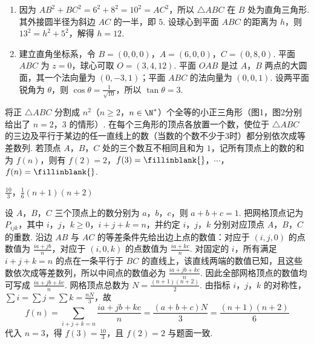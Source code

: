 \begin{solution}
\begin{enumerate}
\item 因为 \(AB^2+BC^2=6^2+8^2=10^2=AC^2\)，所以 \(\triangle ABC\) 在 \(B\) 处为直角三角形. 其外接圆半径为斜边 \(AC\) 的一半，即 \(5\). 设球心到平面 \(ABC\) 的距离为 \(h\)，则 \(13^2=h^2+5^2\)，解得 \(h=12\).
\item 建立直角坐标系，令 \(B=(0,0,0)\)，\(A=(6,0,0)\)，\(C=(0,8,0)\). 平面 \(ABC\) 为 \(z=0\)，球心可取 \(O=(3,4,12)\). 平面 \(OAB\) 是过 \(A\)，\(B\) 两点的大圆面，其一个法向量为 \((0,-3,1)\)；平面 \(ABC\) 的法向量为 \((0,0,1)\). 设两平面锐角为 \(\theta\)，则 \(\cos\theta=\frac{1}{\sqrt{10}}\)，所以 \(\tan\theta=3\).
\end{enumerate}
\end{solution}

\begin{problem}
将正 \(\triangle ABC\) 分割成 \(n^2\)（\(n \geqslant 2\)，\(n \in \N^*\)）个全等的小正三角形（图1，图2分别给出了 \(n = 2\)，\(3\) 的情形）. 在每个三角形的顶点各放置一个数，使位于 \(\triangle ABC\) 的三边及平行于某边的任一直线上的数（当数的个数不少于\(3\)时）都分别依次成等差数列. 若顶点 \(A\)，\(B\)，\(C\) 处的三个数互不相同且和为 \(1\)，记所有顶点上的数的和为 \(f(n)\)，则有 \(f(2) = 2\)，\(f(3) =\fillinblank{}\)，\(\cdots\)，\(f(n) =\fillinblank{}\).

\end{problem}

\begin{answer}
\(\frac{10}{3}\)，\(\frac{1}{6}(n + 1)(n + 2)\)
\end{answer}

\begin{solution}
设 \(A\)，\(B\)，\(C\) 三个顶点上的数分别为 \(a\)，\(b\)，\(c\)，则 \(a+b+c=1\). 把网格顶点记为 \(P_{ijk}\)，其中 \(i\)，\(j\)，\(k\geqslant0\)，\(i+j+k=n\)，并约定 \(i\)，\(j\)，\(k\) 分别对应顶点 \(A\)，\(B\)，\(C\) 的重数. 沿边 \(AB\) 与 \(AC\) 的等差条件先给出边上点的数值：对应于 \((i,j,0)\) 的点数值为 \(\frac{ia+jb}{n}\)，对应于 \((i,0,k)\) 的点数值为 \(\frac{ia+kc}{n}\). 对固定的 \(i\)，所有满足 \(i+j+k=n\) 的点在一条平行于 \(BC\) 的直线上，该直线两端的数值已知，且这些数依次成等差数列，所以中间点的数值必为 \(\frac{ia+jb+kc}{n}\). 因此全部网格顶点的数值均可写成 \(\frac{ia+jb+kc}{n}\). 网格顶点总数为 \(N=\frac{(n+1)(n+2)}2\). 由指标 \(i\)，\(j\)，\(k\) 的对称性，\(\sum i=\sum j=\sum k=\frac{nN}{3}\)，故
\[
f(n)=\sum_{i+j+k=n}\frac{ia+jb+kc}{n}
=\frac{(a+b+c)N}{3}
=\frac{(n+1)(n+2)}6
\]
代入 \(n=3\)，得 \(f(3)=\frac{10}{3}\)，且 \(f(2)=2\) 与题面一致.
\end{solution}

